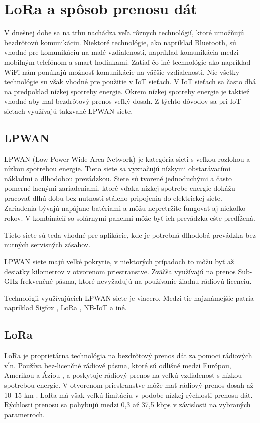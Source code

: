 \documentclass[slovak,master]{diploma}
\begin{document}
\chapter{LoRa a spôsob prenosu dát}
V dnešnej dobe sa na trhu nachádza veľa rôznych technológií, ktoré umožňujú bezdrôtovú komunikáciu. Niektoré technológie, ako napríklad Bluetooth, sú vhodné pre komunikáciu na malé 
vzdialenosti, napríklad komunikácia medzi mobilným telefónom a smart hodinkami. Zatiaľ čo iné technológie ako napríklad WiFi nám ponúkajú možnosť komunikácie na väčšie vzdialenosti. 
Nie všetky technológie su však vhodné pre použitie v IoT sieťach. V IoT sieťach sa často dbá na predpoklad nízkej spotreby energie. Okrem nízkej spotreby energie je taktiež vhodné 
aby mal bezdrôtový prenos veľký dosah. Z týchto dôvodov sa pri IoT sieťach využívajú takzvané LPWAN siete.
\section {LPWAN}
LPWAN (Low Power Wide Area Network) je kategória sieti s veľkou rozlohou a nízkou spotrebou energie. Tieto siete sa vyznačujú nízkymi obstarávacími 
nákladmi a dlhodobou prevádzkou. Siete sú tvorené jednoduchými a často pomerné lacnými zariadeniami, ktoré vďaka nízkej spotrebe energie dokážu pracovať dlhú dobu bez 
nutnosti stáleho pripojenia do elektrickej siete. Zariadenia bývajú napájane batériami a môžu nepretržite fungovať aj niekoľko rokov. V kombinácií so solárnymi panelmi 
môže byť ich prevádzka ešte predĺžená. 

Tieto siete sú teda vhodné pre aplikácie, kde je potrebná dlhodobá prevádzka bez nutných servisných zásahov.

LPWAN siete majú veľké pokrytie, v niektorých prípadoch to môžu byť až desiatky kilometrov v otvorenom priestranstve. Zväčša využívajú na prenos 
Sub-GHz frekvenčné pásma, ktoré nevyžadujú na používanie žiadnu rádiovú licenciu.

Technológii využívajúcich LPWAN siete je viacero. Medzi tie najznámejšie patria napríklad Sigfox \cite{sigfox}, LoRa \cite{lora}, NB-IoT a iné.

\section {LoRa}
LoRa je proprietárna technológia na bezdrôtový prenos dát za pomoci rádiových vĺn.
Používa bez-licenčné rádiové pásma, ktoré sú odlišné medzi Európou, Amerikou a Áziou \cite{loraRegionalParameters}, a poskytuje rádiový prenos na veľkú vzdialenosť s nízkou spotrebou energie.
V otvorenom priestranstve môže mať rádiový prenos dosah až 10--15 km \cite{loraDoc}. LoRa má však veľkú limitáciu v podobe nízkej rýchlosti prenosu dát.
Rýchlosti prenosu sa pohybujú medzi 0,3 až 37,5 kbps v závislosti na vybraných parametroch.
\end{document}
